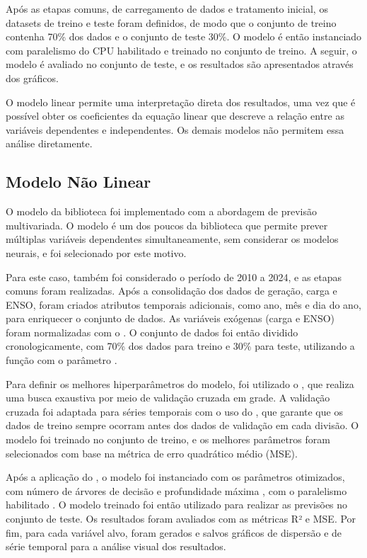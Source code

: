 Após as etapas comuns, de carregamento de dados e tratamento inicial, os datasets de treino e teste foram definidos, de modo que
o conjunto de treino contenha 70\% dos dados e o conjunto de teste 30\%. O modelo é então instanciado com paralelismo do
CPU habilitado e treinado no conjunto de treino. A seguir, o modelo é avaliado no conjunto de teste, e os resultados são
apresentados através dos gráficos.

O modelo linear permite uma interpretação direta dos resultados, uma vez que é possível obter os coeficientes da equação
linear que descreve a relação entre as variáveis dependentes e independentes. Os demais modelos não permitem essa análise diretamente.

\subsection{Modelo Não Linear} %
O modelo  da biblioteca  foi implementado com a abordagem de previsão multivariada.
O modelo é um dos poucos da biblioteca que permite prever múltiplas variáveis dependentes simultaneamente, sem considerar os modelos
neurais, e foi selecionado por este motivo.

Para este caso, também foi considerado o período de 2010 a 2024, e as etapas comuns foram realizadas. Após a consolidação 
dos dados de geração, carga e ENSO, foram criados atributos temporais adicionais, como ano, mês e dia do ano, para enriquecer 
o conjunto de dados. As variáveis exógenas (carga e ENSO) foram normalizadas com o . O conjunto de dados 
foi então dividido cronologicamente, com 70\% dos dados para treino e 30\% para teste, utilizando a função  
com o parâmetro .

Para definir os melhores hiperparâmetros do modelo, foi utilizado o , que realiza uma busca exaustiva por 
meio de validação cruzada em grade. A validação cruzada foi adaptada para séries temporais com o uso do , 
que garante que os dados de treino sempre ocorram antes dos dados de validação em cada divisão. O modelo foi treinado no conjunto 
de treino, e os melhores parâmetros foram selecionados com base na métrica de erro quadrático médio (MSE).

Após a aplicação do , o modelo foi instanciado com os parâmetros otimizados, com número de árvores de decisão 
 e profundidade máxima , com o paralelismo habilitado . O modelo 
treinado foi então utilizado para realizar as previsões no conjunto de teste. Os resultados foram avaliados com as métricas R² e MSE. 
Por fim, para cada variável alvo, foram gerados e salvos gráficos de dispersão e de série temporal para a análise visual dos resultados.


